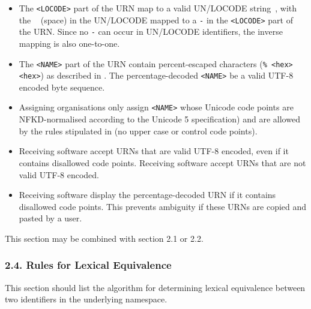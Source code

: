 \documentclass[12pt]{article}  %
\begin{document}
\begin{example}
\begin{itemize}
    \item The \texttt{<LOCODE>} part of the URN \MUST{} map to a valid 
    UN/LOCODE string~\cite{unlocode}, with the \texttt{\qq{} \qq{}} 
    (space) in the UN/LOCODE mapped to a \texttt{\qq{}-\qq{}} in the \texttt{<LOCODE>} 
    part of the URN. Since no \texttt{\qq{}-\qq{}} can occur in UN/LOCODE identifiers, 
    the inverse mapping is also one-to-one.
\end{itemize}
\end{example}
\begin{example}
\begin{itemize}
    \item The \texttt{<NAME>} part of the URN \MAY{} contain percent-escaped 
    characters (\texttt{\qq{}\%\qq{} <hex> <hex>}) as described in \cite{rfc2141}. 
    The percentage-decoded \texttt{<NAME>} \MUST{} be a valid UTF-8 
    encoded byte sequence.
    \item Assigning organisations \SHOULD{} only assign \texttt{<NAME>}
    whose Unicode code points are NFKD-normalised according to the Unicode 5 
    specification)\cite{uax15} and are allowed by 
    the rules stipulated in \cite{rfc5892} (no upper case or control code points).
    \item Receiving software \SHOULD{} accept URNs that are valid UTF-8 encoded, 
    even if it contains disallowed code points. Receiving software \SHOULDNOT{} 
    accept URNs that are not valid UTF-8 encoded.
    \item Receiving software \SHOULDNOT{} display the percentage-decoded URN if it contains 
    disallowed code points. This prevents ambiguity if these URNs are copied and 
    pasted by a user.
\end{itemize}
\end{example}

This section may be combined with section 2.1 or 2.2.

\subsubsection*{2.4. Rules for Lexical Equivalence}

This section should list the algorithm for determining lexical equivalence 
between two identifiers in the underlying namespace.
\end{document}
